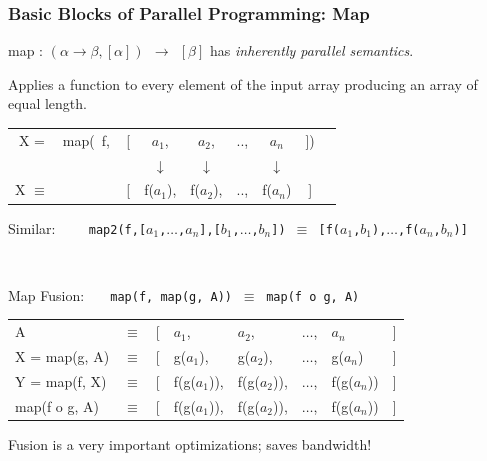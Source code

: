 \documentclass{beamer}
\renewcommand{\emph}[1]{\textcolor{CosGreen}{ #1}}
\newcommand{\emp}[1]{\textcolor{DikuRed}{ #1}}
\begin{document}
\begin{frame}[fragile,t]
   \frametitle{Basic Blocks of Parallel Programming: Map}

\bigskip

\emp{map} : $(\alpha \to \beta, [\alpha]) ~~\to~~ [\beta] $ has \emph{\em inherently parallel semantics}.
\smallskip

Applies a function to every element of the input array producing an array of equal length.

\bigskip

\begin{tabular}{crcccccl}
X = & \emph{map}(~f, ~ [& $a_1$, & $a_2$, & .., & $a_n$ & ])\\
    &      & $\downarrow$ & $\downarrow$ &  & $\downarrow$ & &\\
X $\equiv$ &  [  & \emph{f($a_1$)}, & \emph{f($a_2$)}, & .., & \emph{f($a_n$)} & ] &
\end{tabular}\bigskip

\begin{scriptsize}
Similar: {\tt~~~~map2(f,[$a_1$,$\ldots$,$a_n$],[$b_1$,$\ldots$,$b_n$]) $\equiv$ [f($a_1$,$b_1$),$\ldots$,f($a_n$,$b_n$)]} 
\end{scriptsize}\\\bigskip\pause

\emp{Map Fusion:} \emph{{\tt~~~map(f, map(g, A))} $~\equiv~$ {\tt map(f o g, A)}} \bigskip

\begin{tabular}{llllllll}
A & $\equiv$ & [ & $a_1$, & $a_2$, & $\ldots$, & $a_n$ & ] \\  
X = map(g, A) & $\equiv$ & [ & g($a_1$), &g($a_2$), &$\ldots$, &g($a_n$) &]\\
\emph{Y = map(f, X)} & $\equiv$ & [& \emph{f(g($a_1$))}, &\emph{f(g($a_2$))}, &$\ldots$, &\emph{f(g($a_n$))} &]\\
\emph{map(f o g, A)} & $\equiv$ & [& \emph{f(g($a_1$))}, &\emph{f(g($a_2$))}, &$\ldots$, &\emph{f(g($a_n$))} &]\\
\end{tabular}
\bigskip

Fusion is a very important optimizations; saves bandwidth!

\end{frame}
\end{document}
